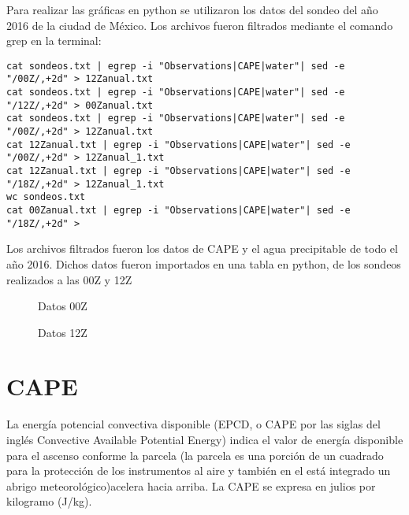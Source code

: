 \documentclass[12pt]{article}
\begin{document}
\newpage
Para realizar las gráficas en python se utilizaron los datos del sondeo del año 2016 de la ciudad de México. Los archivos fueron filtrados mediante el comando grep en la terminal:

\begin{verbatim}
cat sondeos.txt | egrep -i "Observations|CAPE|water"| sed -e "/00Z/,+2d" > 12Zanual.txt
cat sondeos.txt | egrep -i "Observations|CAPE|water"| sed -e "/12Z/,+2d" > 00Zanual.txt
cat sondeos.txt | egrep -i "Observations|CAPE|water"| sed -e "/00Z/,+2d" > 12Zanual.txt
cat 12Zanual.txt | egrep -i "Observations|CAPE|water"| sed -e "/00Z/,+2d" > 12Zanual_1.txt
cat 12Zanual.txt | egrep -i "Observations|CAPE|water"| sed -e "/18Z/,+2d" > 12Zanual_1.txt
wc sondeos.txt
cat 00Zanual.txt | egrep -i "Observations|CAPE|water"| sed -e "/18Z/,+2d" > 

\end{verbatim}

Los archivos filtrados fueron los datos de CAPE y el agua precipitable de todo el año 2016. Dichos datos fueron importados en una tabla en python, de los sondeos realizados a las 00Z y 12Z


\begin{figure}[H]
 \centering
    \caption{Datos 00Z}
\end{figure}


\newpage

\begin{figure}[H]
 \centering
    \caption{Datos 12Z}
\end{figure}



\section*{CAPE}

 La energía potencial convectiva disponible (EPCD, o CAPE por las siglas del inglés Convective Available Potential Energy)  indica el valor de energía disponible para el ascenso conforme la parcela (la parcela es una porción de un cuadrado para la protección  de los instrumentos al aire  y también en el está integrado un abrigo meteorológico)acelera hacia arriba. La CAPE se expresa en julios por kilogramo (J/kg).
 
\end{document}
